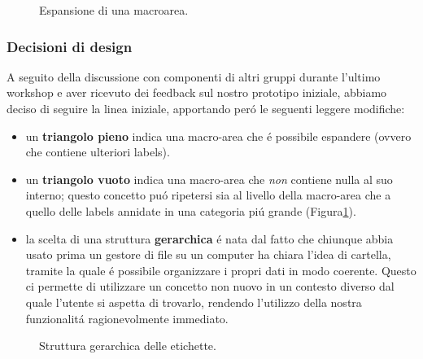 \documentclass[12pt]{article} %
\begin{document}
\begin{figure}[H]
\caption{Espansione di una macroarea.}
\label{fig:low_prototype}
\end{figure}

\subsubsection{Decisioni di design}
A seguito della discussione con componenti di altri gruppi durante l'ultimo workshop e aver ricevuto dei feedback sul nostro prototipo iniziale, abbiamo deciso di seguire la linea iniziale, apportando per\'o le seguenti leggere modifiche:
\begin{itemize}
\item un \textbf{triangolo pieno} indica una macro-area che \'e possibile espandere (ovvero che contiene ulteriori labels).
\item un \textbf{triangolo vuoto} indica una macro-area che \emph{non} contiene nulla al suo interno; questo concetto pu\'o ripetersi sia al livello della macro-area che a quello delle labels annidate in una categoria pi\'u grande (Figura\ref{fig:low_prototype}).
\item la scelta di una struttura \textbf{gerarchica} \'e nata dal fatto che chiunque abbia usato prima un gestore di file su un computer ha chiara l'idea di cartella, tramite la quale \'e possibile organizzare i propri dati in modo coerente. Questo ci permette di utilizzare un concetto non nuovo in un contesto diverso dal quale l'utente si aspetta di trovarlo, rendendo l'utilizzo della nostra funzionalit\'a ragionevolmente immediato.
\end{itemize}

\begin{figure}[H]
\caption{Struttura gerarchica delle etichette.}
\label{fig:low_prototype2}
\end{figure}
\end{document}
